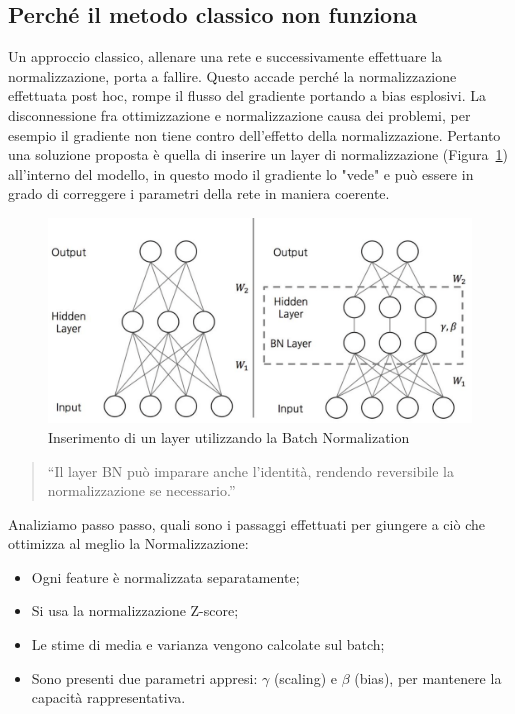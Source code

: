 \subsection{Perché il metodo classico non funziona}
Un approccio classico, allenare una rete e successivamente effettuare la normalizzazione, porta a fallire. Questo accade perché la normalizzazione effettuata post hoc, rompe il flusso del gradiente portando a bias esplosivi. La disconnessione fra ottimizzazione e normalizzazione causa dei problemi, per esempio il gradiente non tiene contro dell'effetto della normalizzazione. Pertanto una soluzione proposta è quella di inserire un layer di normalizzazione (Figura~\ref{fig:bn-layer}) all'interno del modello, in questo modo il gradiente lo "vede" e può essere in grado di correggere i parametri della rete in maniera coerente.
\begin{figure}
    \centering
    \includegraphics[width=0.85\linewidth]{figure/BNlayer.png}
    \caption{Inserimento di un layer utilizzando la Batch Normalization}
    \label{fig:bn-layer}
\end{figure}
\begin{quote}
“Il layer BN può imparare anche l’identità, rendendo reversibile la normalizzazione se necessario.”
\end{quote}

Analiziamo passo passo, quali sono i passaggi effettuati per giungere a ciò che ottimizza al meglio la Normalizzazione:
\begin{itemize}
  \item Ogni feature è normalizzata separatamente;
  \item Si usa la normalizzazione Z-score;
  \item Le stime di media e varianza vengono calcolate sul batch;
  \item Sono presenti due parametri appresi: $\gamma$ (scaling) e $\beta$ (bias), per mantenere la capacità rappresentativa.
\end{itemize}

